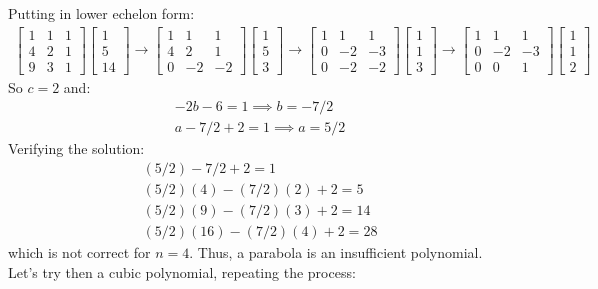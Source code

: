 \documentclass{article}
\begin{document}
Putting in lower echelon form:
\begin{gather*}
	\begin{bmatrix}
		1 & 1 & 1\\
		4 & 2 & 1\\
		9 & 3 & 1
	\end{bmatrix}
	\begin{bmatrix}
		1\\
		5\\
		14
	\end{bmatrix} \rightarrow	
	\begin{bmatrix}
		1 & 1 & 1\\
		4 & 2 & 1\\
		0 & -2 & -2
	\end{bmatrix}
	\begin{bmatrix}
		1\\
		5\\
		3
	\end{bmatrix} \rightarrow	
	\begin{bmatrix}
		1 & 1 & 1\\
		0 & -2 & -3\\
		0 & -2 & -2
	\end{bmatrix}
	\begin{bmatrix}
		1\\
		1\\
		3
	\end{bmatrix} \rightarrow	
	\begin{bmatrix}
		1 & 1 & 1\\
		0 & -2 & -3\\
		0 & 0 & 1
	\end{bmatrix}
	\begin{bmatrix}
		1\\
		1\\
		2
	\end{bmatrix}	
\end{gather*}
So $c = 2$ and:
\begin{gather*}
	-2b - 6 = 1 \implies b = -7/2\\
	a - 7/2 + 2 = 1 \implies a = 5/2
\end{gather*}
Verifying the solution:
\begin{gather*}
	(5/2) - 7/2 + 2 = 1\\
	(5/2)(4) - (7/2)(2) + 2 = 5\\
	(5/2)(9) - (7/2)(3) + 2 = 14\\
	(5/2)(16) - (7/2)(4) + 2 = 28
\end{gather*}
which is not correct for $n = 4$. Thus, a parabola is an insufficient polynomial. Let's try then a cubic polynomial, repeating the process:
\end{document}
